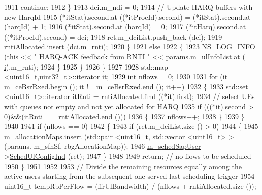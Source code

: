 \begin{DoxyCode}
1911                   \textcolor{keywordflow}{continue};
1912                 \}
1913               dci.m\_ndi = 0;
1914               \textcolor{comment}{// Update HARQ buffers with new HarqId}
1915               (*itStat).second.at ((*itProcId).second) = (*itStat).second.at (harqId) + 1;
1916               (*itStat).second.at (harqId) = 0;
1917               (*itHarq).second.at ((*itProcId).second) = dci;
1918               ret.m\_dciList.push\_back (dci);
1919               rntiAllocated.insert (dci.m\_rnti);
1920             \}
1921             \textcolor{keywordflow}{else}
1922             \{
1923               \hyperlink{group__logging_gafbd73ee2cf9f26b319f49086d8e860fb}{NS\_LOG\_INFO} (\textcolor{keyword}{this} << \textcolor{stringliteral}{" HARQ-ACK feedback from RNTI "} << params.m\_ulInfoList.at (
      \hyperlink{bernuolliDistribution_8m_a6f6ccfcf58b31cb6412107d9d5281426}{i}).m\_rnti);
1924             \}
1925         \}
1926     \}
1927 
1928   std::map <uint16\_t,uint32\_t>::iterator it;
1929   \textcolor{keywordtype}{int} nflows = 0;
1930 
1931   \textcolor{keywordflow}{for} (it = \hyperlink{classns3_1_1PssFfMacScheduler_a7adb86186e0190e6b0aa66a562499268}{m\_ceBsrRxed}.begin (); it != \hyperlink{classns3_1_1PssFfMacScheduler_a7adb86186e0190e6b0aa66a562499268}{m\_ceBsrRxed}.end (); it++)
1932     \{
1933       std::set <uint16\_t>::iterator itRnti = rntiAllocated.find ((*it).first);
1934       \textcolor{comment}{// select UEs with queues not empty and not yet allocated for HARQ}
1935       \textcolor{keywordflow}{if} (((*it).second > 0)&&(itRnti == rntiAllocated.end ()))
1936         \{
1937           nflows++;
1938         \}
1939     \}
1940 
1941   \textcolor{keywordflow}{if} (nflows == 0)
1942     \{
1943       \textcolor{keywordflow}{if} (ret.m\_dciList.size () > 0)
1944         \{
1945           \hyperlink{classns3_1_1PssFfMacScheduler_ad06e7461edc613eb44a4a9c474915022}{m\_allocationMaps}.insert (std::pair <uint16\_t, std::vector <uint16\_t> > (params.
      m\_sfnSf, rbgAllocationMap));
1946           \hyperlink{classns3_1_1PssFfMacScheduler_aef80e10798607daea4efdf4cf1297bd9}{m\_schedSapUser}->\hyperlink{classns3_1_1FfMacSchedSapUser_a1b89636256701a84d990db7db8aea874}{SchedUlConfigInd} (ret);
1947         \}
1948         
1949       \textcolor{keywordflow}{return};  \textcolor{comment}{// no flows to be scheduled}
1950     \}
1951 
1952 
1953   \textcolor{comment}{// Divide the remaining resources equally among the active users starting from the subsequent one served
       last scheduling trigger}
1954   uint16\_t tempRbPerFlow = (ffrUlBandwidth) / (nflows + rntiAllocated.size ());

\end{DoxyCode}
